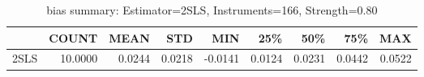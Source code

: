 \begin{table}[ht]
\centering
\caption{bias summary: Estimator=2SLS, Instruments=166, Strength=0.80}
\begin{tabular}{lrrrrrrrr}
\toprule
 & COUNT & MEAN & STD & MIN & 25\% & 50\% & 75\% & MAX \\
\midrule
2SLS & 10.0000 & 0.0244 & 0.0218 & -0.0141 & 0.0124 & 0.0231 & 0.0442 & 0.0522 \\
\bottomrule
\end{tabular}
\end{table}
